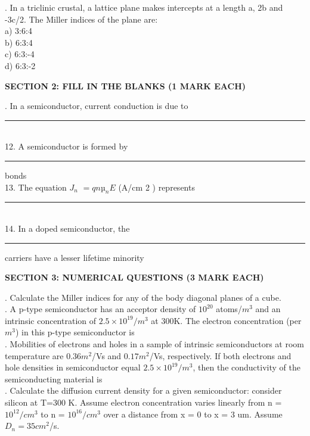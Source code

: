 \documentclass[12pt]{article}\date{}
\begin{document}
. In a triclinic crustal, a lattice plane makes intercepts at a length a, 2b and -3c/2. The Miller indices of the plane are: \\
a) 3:6:4 \\
b) 6:3:4 \\
c) 6:3:-4 \\
d) 6:3:-2 \\ [30pt]

\begin{large}
\textbf{SECTION 2: FILL IN THE BLANKS (1 MARK EACH)} \\[30pt]
\end{large} 

. In a semiconductor, current conduction is due to \rule{1cm}{0.15mm}  \\
12. A semiconductor is formed by \rule{1cm}{0.15mm} bonds \\
13. The equation $J_n$ $=qnµ_nE$ (A/cm 2 ) represents \rule{1cm}{0.15mm}\\
14. In a doped semiconductor, the \rule{1cm}{0.15mm} carriers have a lesser lifetime minority \\[30pt]

\begin{large}
\textbf{SECTION 3: NUMERICAL QUESTIONS (3 MARK EACH)} \\[30pt]
\end{large} 

. Calculate the Miller indices for any of the body diagonal planes of a cube. \\ [15pt]

. A p-type semiconductor has an acceptor density of $10^{20}$ atoms/$m^3$ and an intrinsic concentration of $2.5 \times 10^{19}/m^3$ at 300K. The electron concentration (per $m^3$) in this p-type semiconductor is \\ [15pt]

. Mobilities of electrons and holes in a sample of intrinsic semiconductors at room temperature are $0.36 m^2$/Vs and $0.17 m^2$/Vs, respectively. If both electrons and hole densities in semiconductor equal $2.5 \times 10^{19}/m^3$, then the conductivity of the semiconducting material is \\ [15pt]

. Calculate the diffusion current density for a given semiconductor: consider silicon at T=300 K. Assume electron concentration varies linearly from n = $10^{12}/cm^3$ to n = $10^{16}/cm^3$ over a distance from x = 0 to x = 3 um. Assume $D_n = 35 cm^2$/s. \\ [15pt]
\end{document}
